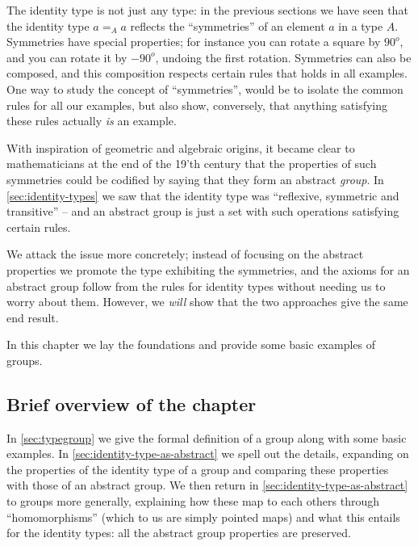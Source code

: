 \label{ch:groups}



The identity type is not just any type:  in the previous sections we have seen that the identity type $a=_Aa$ reflects the ``symmetries'' of an element $a$ in a type $A$.  
Symmetries have special properties; for instance you can rotate a square by $90^o$, and you can rotate it by $-90^o$, undoing the first rotation.
Symmetries can also be composed, and this composition respects certain rules that holds in all examples.  One way to study the concept of ``symmetries'', would be to isolate the common rules for all our examples, but also show, conversely, that anything satisfying these rules actually \emph{is} an example. 




With inspiration of geometric and algebraic origins, it became clear to mathematicians at the end of the 19'th century that the properties of such symmetries could be codified by saying that they form an abstract \emph{group}. 
In \cref{sec:identity-types} we saw that the identity type was ``reflexive, symmetric and transitive'' -- and an abstract group is just a set with such operations satisfying certain rules.


We attack the issue more concretely; instead of focusing on the abstract properties we promote the type exhibiting the symmetries, and the axioms for an abstract group follow from the rules for identity types without needing us to worry about them.  However, we \emph{will} show that the two approaches give the same end result.  

In this chapter we lay the foundations and provide some basic examples of groups.  

\subsection{Brief overview of the chapter}
In \cref{sec:typegroup} we give the formal definition of a group along with some basic examples.  
In \cref{sec:identity-type-as-abstract} we spell out the details, expanding on the properties of the identity type of a group and comparing these properties with those of an abstract group.  We then return in \cref {sec:identity-type-as-abstract} to groups more generally, explaining how these map to each others through ``homomorphisms'' (which to us are simply pointed maps) and what this entails for the identity types: all the abstract group properties are preserved.  

